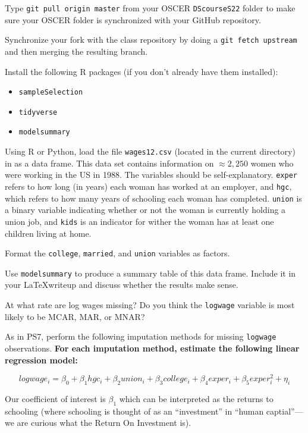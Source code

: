 \documentclass[12pt,english]{exam}
\begin{document}
\begin{questions}
\question Type \texttt{git pull origin master} from your OSCER \texttt{DScourseS22} folder to make sure your OSCER folder is synchronized with your GitHub repository. 

\question Synchronize your fork with the class repository by doing a \texttt{git fetch upstream} and then merging the resulting branch. 

\question Install the following R packages (if you don't already have them installed):
\begin{itemize}
    \item \texttt{sampleSelection}
    \item \texttt{tidyverse}
    \item \texttt{modelsummary}
\end{itemize}

\question Using R or Python, load the file \texttt{wages12.csv} (located in the current directory) in as a data frame. This data set contains information on $\approx 2,250$ women who were working in the US in 1988. The variables should be self-explanatory. \texttt{exper} refers to how long (in years) each woman has worked at an employer, and \texttt{hgc}, which refers to how many years of schooling each woman has completed. \texttt{union} is a binary variable indicating whether or not the woman is currently holding a union job, and \texttt{kids} is an indicator for wither the woman has at least one children living at home.

\question Format the \texttt{college}, \texttt{married}, and \texttt{union} variables as factors.

\question Use \texttt{modelsummary} to produce a summary table of this data frame. Include it in your \LaTeX writeup and discuss whether the results make sense.

At what rate are log wages missing? Do you think the \texttt{logwage} variable is most likely to be MCAR, MAR, or MNAR?

\question As in PS7, perform the following imputation methods for missing \texttt{logwage} observations. \textbf{For each imputation method, estimate the following linear regression model:}

\[
    logwage_{i} = \beta_{0} +  \beta_{1}hgc_{i} + \beta_{2}union_{i} + \beta_{3}college_{i} + \beta_{4}exper_{i} + \beta_{5}exper^{2}_{i} + \eta_{i}
\]

Our coefficient of interest is $\beta_{1}$ which can be interpreted as the returns to schooling (where schooling is thought of as an ``investment'' in ``human captial''---we are curious what the Return On Investment is).


\end{questions}
\end{document}
